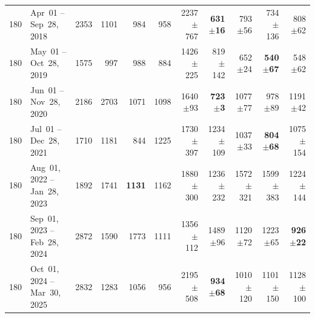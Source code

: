 \begin{longtable}{r l r r r r r r r r r}
180 & Apr~01 -- Sep~28, 2018 & 2353 & 1101 & 984 & 958 & 2237{\tiny$\pm$767} & \textbf{631{\tiny$\pm$16}} & 793{\tiny$\pm$56} & 734{\tiny$\pm$136} & 808{\tiny$\pm$62} \\
180 & May~01 -- Oct~28, 2019 & 1575 & 997 & 988 & 884 & 1426{\tiny$\pm$225} & 819{\tiny$\pm$142} & 652{\tiny$\pm$24} & \textbf{540{\tiny$\pm$67}} & 548{\tiny$\pm$62} \\
180 & Jun~01 -- Nov~28, 2020 & 2186 & 2703 & 1071 & 1098 & 1640{\tiny$\pm$93} & \textbf{723{\tiny$\pm$3}} & 1077{\tiny$\pm$77} & 978{\tiny$\pm$89} & 1191{\tiny$\pm$42} \\
180 & Jul~01 -- Dec~28, 2021 & 1710 & 1181 & 844 & 1225 & 1730{\tiny$\pm$397} & 1234{\tiny$\pm$109} & 1037{\tiny$\pm$33} & \textbf{804{\tiny$\pm$68}} & 1075{\tiny$\pm$154} \\
180 & Aug~01, 2022 -- Jan~28, 2023 & 1892 & 1741 & \textbf{1131} & 1162 & 1880{\tiny$\pm$300} & 1236{\tiny$\pm$232} & 1572{\tiny$\pm$321} & 1599{\tiny$\pm$383} & 1224{\tiny$\pm$144} \\
180 & Sep~01, 2023 -- Feb~28, 2024 & 2872 & 1590 & 1773 & 1111 & 1356{\tiny$\pm$112} & 1489{\tiny$\pm$96} & 1120{\tiny$\pm$72} & 1223{\tiny$\pm$65} & \textbf{926{\tiny$\pm$22}} \\
180 & Oct~01, 2024 -- Mar~30, 2025 & 2832 & 1283 & 1056 & 956 & 2195{\tiny$\pm$508} & \textbf{934{\tiny$\pm$68}} & 1010{\tiny$\pm$120} & 1101{\tiny$\pm$150} & 1128{\tiny$\pm$100} \\
\end{longtable}
\endgroup



